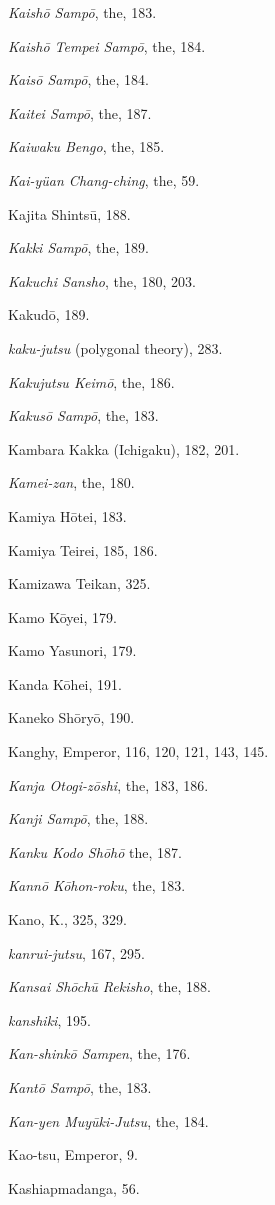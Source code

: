 \documentclass[11pt]{article}
\begin{document}
\emph{Kaishō Sampō}, the, 183.\par
\emph{Kaishō Tempei Sampō}, the, 184.\par
\emph{Kaisō Sampō}, the, 184.\par
\emph{Kaitei Sampō}, the, 187.\par
\emph{Kaiwaku Bengo}, the, 185.\par
\emph{Kai-yüan Chang-ching}, the, 59.\par
Kajita Shintsū, 188.\par
\emph{Kakki Sampō}, the, 189.\par
\emph{Kakuchi Sansho}, the, 180, 203.\par
Kakudō, 189.\par
\emph{kaku-jutsu} (polygonal theory), 283.\par
\emph{Kakujutsu Keimō}, the, 186.\par
\emph{Kakusō Sampō}, the, 183.\par
Kambara Kakka (Ichigaku), 182, 201.\par
\emph{Kamei-zan}, the, 180.\par
Kamiya Hōtei, 183.\par
Kamiya Teirei, 185, 186.\par
Kamizawa Teikan, 325.\par
Kamo Kōyei, 179.\par
Kamo Yasunori, 179.\par
Kanda Kōhei, 191.\par
Kaneko Shōryō, 190.\par
Kanghy, Emperor, 116, 120, 121, 143, 145.\par
\emph{Kanja Otogi-zōshi}, the, 183, 186.\par
\emph{Kanji Sampō}, the, 188.\par
\emph{Kanku Kodo Shōhō} the, 187.\par
\emph{Kannō Kōhon-roku}, the, 183.\par
Kano, K., 325, 329.\par
\emph{kanrui-jutsu}, 167, 295.\par
\emph{Kansai Shōchū Rekisho}, the, 188.\par
\emph{kanshiki}, 195.\par
\emph{Kan-shinkō Sampen}, the, 176.\par
\emph{Kantō Sampō}, the, 183.\par
\emph{Kan-yen Muyūki-Jutsu}, the, 184.\par
Kao-tsu, Emperor, 9.\par
Kashiapmadanga, 56.\par
\end{document}
